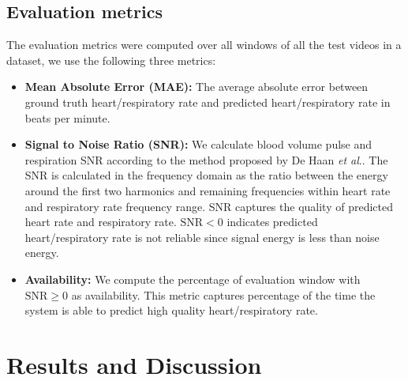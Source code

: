 \documentclass[conference]{IEEEtran}
\newcommand{\etal}{\textit{et al}.}
\begin{document}
\subsection{Evaluation metrics}
The evaluation metrics were computed over all  windows  of  all  the  test  videos in a dataset, we use the following three metrics:
\begin{itemize}
    \item \textbf{Mean Absolute  Error (MAE):} The average absolute error between ground truth heart/respiratory rate and predicted heart/respiratory rate in beats per minute.
    
    \item \textbf{Signal to Noise Ratio (SNR):} We calculate blood volume pulse and respiration SNR according to the method proposed by De Haan \etal \cite{de2013robust}. The SNR is calculated in the frequency domain as the ratio between the energy around the first two harmonics and remaining frequencies within heart rate and respiratory rate frequency range. SNR captures the quality of predicted heart rate and respiratory rate. $\text{SNR} < 0$ indicates predicted heart/respiratory rate is not reliable since signal energy is less than noise energy. 
    
    \item \textbf{Availability:} We compute the percentage of evaluation window with $\text{SNR} \ge 0$ as availability. This metric captures percentage of the time the system is able to predict high quality heart/respiratory rate. 
\end{itemize}


\section{Results and Discussion}
\end{document}
